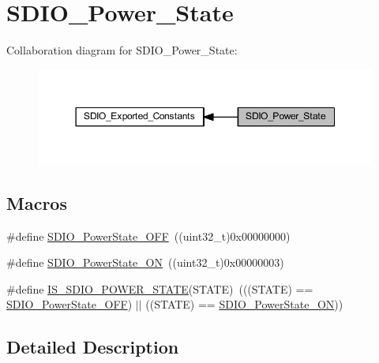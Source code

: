 \hypertarget{group___s_d_i_o___power___state}{}\section{S\+D\+I\+O\+\_\+\+Power\+\_\+\+State}
\label{group___s_d_i_o___power___state}
Collaboration diagram for S\+D\+I\+O\+\_\+\+Power\+\_\+\+State\+:
\nopagebreak
\begin{figure}[H]
\begin{center}
\leavevmode
\includegraphics[width=350pt]{group___s_d_i_o___power___state}
\end{center}
\end{figure}
\subsection*{Macros}
\begin{DoxyCompactItemize}
\item 
\#define \hyperlink{group___s_d_i_o___power___state_gab2f36a68fc50795ea74a7e98b4ac2d37}{S\+D\+I\+O\+\_\+\+Power\+State\+\_\+\+O\+FF}~((uint32\+\_\+t)0x00000000)
\item 
\#define \hyperlink{group___s_d_i_o___power___state_ga0aacd8c94effe8066c6d447fc884d217}{S\+D\+I\+O\+\_\+\+Power\+State\+\_\+\+ON}~((uint32\+\_\+t)0x00000003)
\item 
\#define \hyperlink{group___s_d_i_o___power___state_gad0dae767c2024de1769efb1feccc14ef}{I\+S\+\_\+\+S\+D\+I\+O\+\_\+\+P\+O\+W\+E\+R\+\_\+\+S\+T\+A\+TE}(S\+T\+A\+TE)~(((S\+T\+A\+TE) == \hyperlink{group___s_d_i_o___power___state_gab2f36a68fc50795ea74a7e98b4ac2d37}{S\+D\+I\+O\+\_\+\+Power\+State\+\_\+\+O\+FF}) $\vert$$\vert$ ((S\+T\+A\+TE) == \hyperlink{group___s_d_i_o___power___state_ga0aacd8c94effe8066c6d447fc884d217}{S\+D\+I\+O\+\_\+\+Power\+State\+\_\+\+ON}))
\end{DoxyCompactItemize}


\subsection{Detailed Description}


